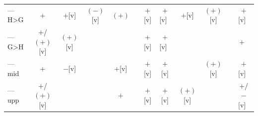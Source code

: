 \documentclass[12pt]{article}
\begin{document}
\begin{table}
\begin{tabular}{lccccccccccc}
--- H>G                   & $+$          & $+$[v]   & $(-)$[v] & $(+)$  &        & $+$[v] & $+$[v]~  & $+$[v]   & $(+)$[v] &              & $+$[v]~ \\
--- G>H                   & $+$/$(+)$[v] & $(+)$[v] &          &        &        & $+$[v] & $+$[v]~  &          &          &              & $+$~ \\
--- mid                   & $+$          & $-$[v]   &          & $+$[v] &        & $+$[v] & $+$[v]   &          & $(+)$[v] &              & $+$[v]~ \\
--- upp                   & $+$/$(+)$[v] &          &          & $+$    &        & $+$[v] & $+$[v]   & $(+)$[v] &          &              & $+$/$-$[v]~ \\
\bottomrule
\end{tabular}
\end{table}
\end{document}
